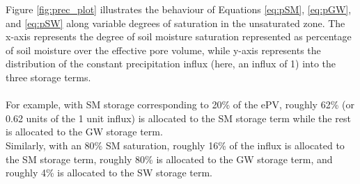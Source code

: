 Figure \ref{fig:prec_plot} illustrates the behaviour of Equations \ref{eq:pSM}, \ref{eq:pGW}, and \ref{eq:pSW} along variable degrees of saturation in the unsaturated zone. The x-axis represents the degree of soil moisture saturation represented as percentage of soil moisture over the effective pore volume, while y-axis represents the distribution of the constant precipitation influx (here, an influx of 1) into the three storage terms.
\\ \\
For example, with SM storage corresponding to 20\% of the ePV, roughly 62\% (or 0.62 units of the 1 unit influx) is allocated to the SM storage term while the rest is allocated to the GW storage term.
\\
Similarly, with an 80\% SM saturation, roughly 16\% of the influx is allocated to the SM storage term, roughly 80\% is allocated to the GW storage term, and roughly 4\% is allocated to the SW storage term.

